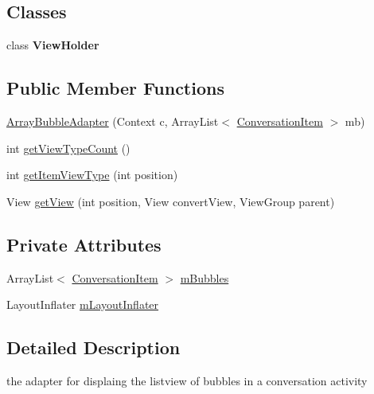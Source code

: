 \subsection*{Classes}
\begin{DoxyCompactItemize}
\item 
class {\bfseries View\+Holder}
\end{DoxyCompactItemize}
\subsection*{Public Member Functions}
\begin{DoxyCompactItemize}
\item 
\hyperlink{a00002_adbd2cc40c8a00dabffd7b33ef3c7d247}{Array\+Bubble\+Adapter} (Context c, Array\+List$<$ \hyperlink{a00007}{Conversation\+Item} $>$ mb)
\item 
int \hyperlink{a00002_a8085b7d181222b03ef9547a4833ce997}{get\+View\+Type\+Count} ()
\item 
int \hyperlink{a00002_a6d3ccfe62c0e893718ad6266b6207e53}{get\+Item\+View\+Type} (int position)
\item 
View \hyperlink{a00002_af6292d542d7937de5b4044234a2db905}{get\+View} (int position, View convert\+View, View\+Group parent)
\end{DoxyCompactItemize}
\subsection*{Private Attributes}
\begin{DoxyCompactItemize}
\item 
Array\+List$<$ \hyperlink{a00007}{Conversation\+Item} $>$ \hyperlink{a00002_a347536a1eb8525c224f457613e34a80f}{m\+Bubbles}
\item 
Layout\+Inflater \hyperlink{a00002_a4e02ab86d39fcfd990b8dd2f36ccc3c9}{m\+Layout\+Inflater}
\end{DoxyCompactItemize}


\subsection{Detailed Description}
the adapter for displaing the listview of bubbles in a conversation activity 


